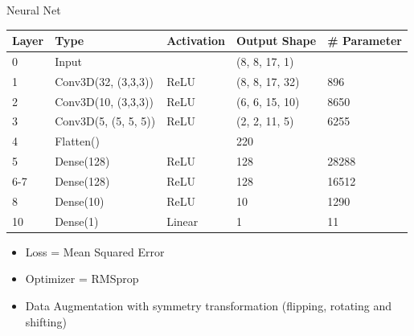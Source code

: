 \documentclass[10pt]{beamer}
\begin{document}
\begin{frame}{Neural Net}
  \centering
  \begin{tabular}{l|l|l|l|l}
    Layer & Type  & Activation & Output Shape & \# Parameter \\
    \hline
    0     & Input &            & (8, 8, 17, 1) &  \\
    1   & Conv3D(32, (3,3,3)) & ReLU & (8, 8, 17, 32)   & 896   \\
    2   & Conv3D(10, (3,3,3)) & ReLU & (6, 6, 15, 10)   & 8650  \\
    3   &  Conv3D(5, (5, 5, 5)) & ReLU & (2, 2, 11, 5)  & 6255  \\
    4     & Flatten()  & & 220 &               \\
    5   & Dense(128)                          & ReLU & 128 & 28288          \\
    6-7 & Dense(128)  & ReLU & 128 & 16512 \\
    8     & Dense(10)                           & ReLU & 10 & 1290         \\
    10     & Dense(1)                            & Linear   & 1 & 11 
  \end{tabular}
  \begin{itemize}
  \item Loss = Mean Squared Error
  \item Optimizer = RMSprop
  \item Data Augmentation with symmetry transformation (flipping, rotating and shifting)
  \end{itemize}
\end{frame}
\end{document}
